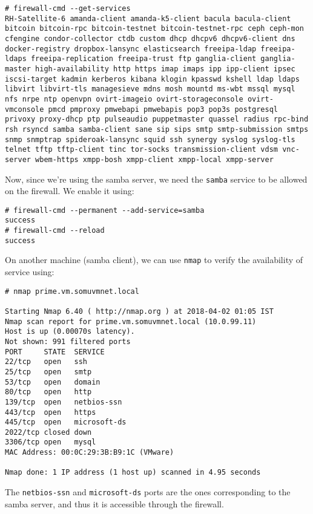 \vspace{-15pt}
\begin{verbatim}
# firewall-cmd --get-services 
RH-Satellite-6 amanda-client amanda-k5-client bacula bacula-client bitcoin bitcoin-rpc bitcoin-testnet bitcoin-testnet-rpc ceph ceph-mon cfengine condor-collector ctdb custom dhcp dhcpv6 dhcpv6-client dns docker-registry dropbox-lansync elasticsearch freeipa-ldap freeipa-ldaps freeipa-replication freeipa-trust ftp ganglia-client ganglia-master high-availability http https imap imaps ipp ipp-client ipsec iscsi-target kadmin kerberos kibana klogin kpasswd kshell ldap ldaps libvirt libvirt-tls managesieve mdns mosh mountd ms-wbt mssql mysql nfs nrpe ntp openvpn ovirt-imageio ovirt-storageconsole ovirt-vmconsole pmcd pmproxy pmwebapi pmwebapis pop3 pop3s postgresql privoxy proxy-dhcp ptp pulseaudio puppetmaster quassel radius rpc-bind rsh rsyncd samba samba-client sane sip sips smtp smtp-submission smtps snmp snmptrap spideroak-lansync squid ssh synergy syslog syslog-tls telnet tftp tftp-client tinc tor-socks transmission-client vdsm vnc-server wbem-https xmpp-bosh xmpp-client xmpp-local xmpp-server
\end{verbatim}
\vspace{-10pt}	

\noindent
Now, since we're using the samba server, we need the \verb|samba| service to be allowed on the firewall. We enable it using:

\vspace{-15pt}
\begin{verbatim}
# firewall-cmd --permanent --add-service=samba
success
# firewall-cmd --reload
success
\end{verbatim}
\vspace{-10pt}	

\noindent
On another machine (samba client), we can use \verb|nmap| to verify the availability of service using:

\vspace{-15pt}
\begin{verbatim}
# nmap prime.vm.somuvmnet.local

Starting Nmap 6.40 ( http://nmap.org ) at 2018-04-02 01:05 IST
Nmap scan report for prime.vm.somuvmnet.local (10.0.99.11)
Host is up (0.00070s latency).
Not shown: 991 filtered ports
PORT     STATE  SERVICE
22/tcp   open   ssh
25/tcp   open   smtp
53/tcp   open   domain
80/tcp   open   http
139/tcp  open   netbios-ssn
443/tcp  open   https
445/tcp  open   microsoft-ds
2022/tcp closed down
3306/tcp open   mysql
MAC Address: 00:0C:29:3B:B9:1C (VMware)

Nmap done: 1 IP address (1 host up) scanned in 4.95 seconds
\end{verbatim}
\vspace{-10pt}	

\noindent
The \verb|netbios-ssn| and \verb|microsoft-ds| ports are the ones corresponding to the samba server, and thus it is accessible through the firewall. 